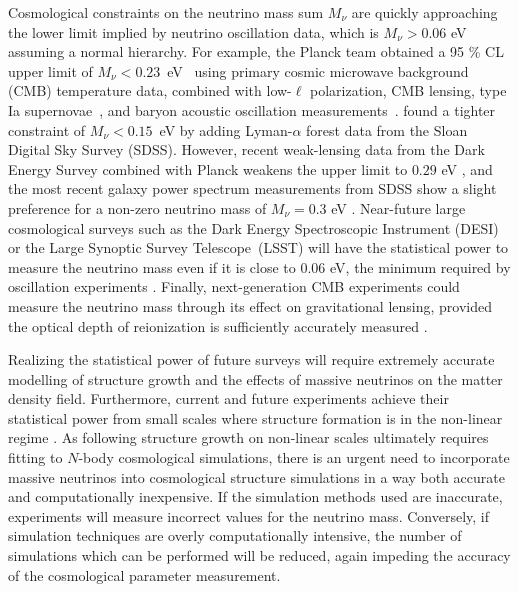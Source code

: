 \documentclass[useAMS, usenatbib]{mnras}
\begin{document}
Cosmological constraints on the neutrino mass sum $M_\nu$ are quickly approaching the lower limit implied by neutrino oscillation data, which is $M_\nu > 0.06$ eV assuming a normal hierarchy. For example, the Planck team obtained a 95 \% CL upper limit of $M_\nu<0.23$~eV~\citep{planck2015xiii} using primary cosmic microwave background (CMB) temperature data, combined with low-$\ell$ polarization, CMB lensing, type Ia supernovae~\citep{Betoule_2014}, and baryon acoustic oscillation
measurements~\citep{Beutler_2011, Anderson_2014, Ross_2015}. \cite{Palanque_2015} found a tighter constraint of $M_\nu<0.15$~eV by adding Lyman-$\alpha$ forest data from the Sloan Digital Sky Survey (SDSS). However, recent weak-lensing data from the Dark Energy Survey combined with Planck weakens the upper limit to $0.29$ eV \citep{DES_2017}, and the most recent galaxy power spectrum measurements from SDSS show a slight preference for a non-zero neutrino mass of $M_\nu = 0.3$ eV \citep{Beutler_2014}.
Near-future large cosmological surveys such as the Dark Energy Spectroscopic Instrument (DESI) \citep{DESI} or the
Large Synoptic Survey Telescope~(LSST) \citep{LSST, Joudaki_2012} will have the statistical power to measure the neutrino mass even if it is close to $0.06$ eV, the minimum required by oscillation experiments \citep{Abazajian_2015}. Finally, next-generation CMB experiments could measure the neutrino mass through its effect on gravitational lensing, provided the optical depth of reionization is sufficiently accurately measured \citep{Abazajian_16}.

Realizing the statistical power of future surveys will require extremely accurate modelling of structure growth and the effects of massive neutrinos on the matter density field.
Furthermore, current and future experiments achieve their statistical power from small scales where structure formation is in the non-linear regime \citep[e.g.~][]{Troxel_2017, HSC_2017}.
As following structure growth on non-linear scales ultimately requires fitting to $N$-body cosmological simulations, there is an urgent need to incorporate massive neutrinos into cosmological structure simulations
in a way both accurate and computationally inexpensive.
If the simulation methods used are inaccurate, experiments will measure incorrect values for the neutrino mass.
Conversely, if simulation techniques are overly computationally intensive, the number of simulations which can be performed will be reduced, again impeding the accuracy of the cosmological parameter measurement.
\end{document}
